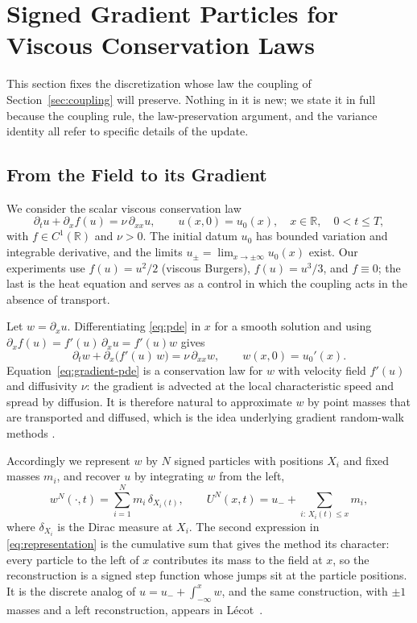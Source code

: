 \documentclass[smallextended,nospthms]{svjour3}
\theoremstyle{plain}
\theoremstyle{definition}
\theoremstyle{remark}
\numberwithin{equation}{section}
\newcommand{\R}{\mathbb{R}}
\begin{document}
\section{Signed Gradient Particles for Viscous Conservation Laws}
\label{sec:background}

This section fixes the discretization whose law the coupling of
Section~\ref{sec:coupling} will preserve. Nothing in it is new; we state it in
full because the coupling rule, the law-preservation argument, and the variance
identity all refer to specific details of the update.

\subsection{From the Field to its Gradient}
\label{sec:representation}

We consider the scalar viscous conservation law
\begin{equation}
 \partial_t u+\partial_x f(u)=\nu\,\partial_{xx}u,\qquad
 u(x,0)=u_0(x),\quad x\in\R,\quad 0<t\le T,
 \label{eq:pde}
\end{equation}
with $f\in C^1(\R)$ and $\nu>0$. The initial datum $u_0$ has bounded variation
and integrable derivative, and the limits
$u_\pm=\lim_{x\to\pm\infty}u_0(x)$ exist. Our experiments use
$f(u)=u^2/2$ (viscous Burgers), $f(u)=u^3/3$, and $f\equiv0$; the last is the
heat equation and serves as a control in which the coupling acts in the absence
of transport.

Let $w=\partial_x u$. Differentiating \eqref{eq:pde} in $x$ for a smooth
solution and using $\partial_x f(u)=f'(u)\,\partial_x u=f'(u)w$ gives
\begin{equation}
 \partial_t w+\partial_x\bigl(f'(u)\,w\bigr)=\nu\,\partial_{xx}w,
 \qquad w(x,0)=u_0'(x).
 \label{eq:gradient-pde}
\end{equation}
Equation~\eqref{eq:gradient-pde} is a conservation law for $w$ with velocity
field $f'(u)$ and diffusivity $\nu$: the gradient is advected at the local
characteristic speed and spread by diffusion. It is therefore natural to
approximate $w$ by point masses that are transported and diffused, which is the
idea underlying gradient random-walk methods
\citep{ghoniem1985,roberts1989,shermanmascagni1994}.

Accordingly we represent $w$ by $N$ signed particles with positions $X_i$ and
fixed masses $m_i$, and recover $u$ by integrating $w$ from the left,
\begin{equation}
 w^N(\cdot,t)=\sum_{i=1}^N m_i\,\delta_{X_i(t)},
 \qquad
 U^N(x,t)=u_-+\!\!\sum_{i:\,X_i(t)\le x}\!\! m_i ,
 \label{eq:representation}
\end{equation}
where $\delta_{X_i}$ is the Dirac measure at $X_i$. The second expression in
\eqref{eq:representation} is the cumulative sum that gives the method its
character: every particle to the left of $x$ contributes its mass to the field
at $x$, so the reconstruction is a signed step function whose jumps sit at the
particle positions. It is the discrete analog of $u=u_-+\int_{-\infty}^{x}w$,
and the same construction, with $\pm1$ masses and a left reconstruction,
appears in Lécot~\citep[Eqs. (35)--(37)]{lecot_rims2001}.
\end{document}
